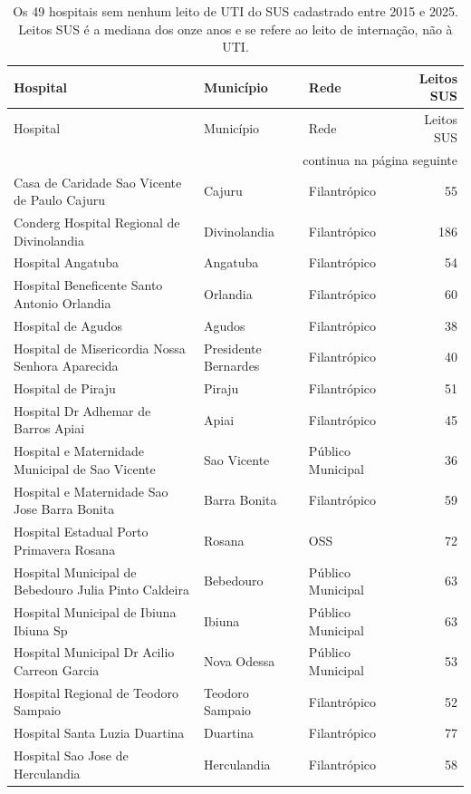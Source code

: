 {\small
\begin{longtable}{p{}p{}lr}
\caption{Os 49 hospitais sem nenhum leito de UTI do SUS cadastrado entre
2015 e 2025. Leitos SUS é a mediana dos onze anos e se refere ao leito de
internação, não à UTI.}
\label{tab:semutisus}\\
\toprule
Hospital & Município & Rede & Leitos SUS \\
\midrule
\endfirsthead
\toprule
Hospital & Município & Rede & Leitos SUS \\
\midrule
\endhead
\midrule
\multicolumn{4}{r}{\footnotesize continua na página seguinte}\\
\endfoot
\bottomrule
\endlastfoot
Casa de Caridade Sao Vicente de Paulo Cajuru & Cajuru & Filantrópico & 55 \\
Conderg Hospital Regional de Divinolandia & Divinolandia & Filantrópico & 186 \\
Hospital Angatuba & Angatuba & Filantrópico & 54 \\
Hospital Beneficente Santo Antonio Orlandia & Orlandia & Filantrópico & 60 \\
Hospital de Agudos & Agudos & Filantrópico & 38 \\
Hospital de Misericordia Nossa Senhora Aparecida & Presidente Bernardes & Filantrópico & 40 \\
Hospital de Piraju & Piraju & Filantrópico & 51 \\
Hospital Dr Adhemar de Barros Apiai & Apiai & Filantrópico & 45 \\
Hospital e Maternidade Municipal de Sao Vicente & Sao Vicente & Público Municipal & 36 \\
Hospital e Maternidade Sao Jose Barra Bonita & Barra Bonita & Filantrópico & 59 \\
Hospital Estadual Porto Primavera Rosana & Rosana & OSS & 72 \\
Hospital Municipal de Bebedouro Julia Pinto Caldeira & Bebedouro & Público Municipal & 63 \\
Hospital Municipal de Ibiuna Ibiuna Sp & Ibiuna & Público Municipal & 63 \\
Hospital Municipal Dr Acilio Carreon Garcia & Nova Odessa & Público Municipal & 53 \\
Hospital Regional de Teodoro Sampaio & Teodoro Sampaio & Filantrópico & 52 \\
Hospital Santa Luzia Duartina & Duartina & Filantrópico & 77 \\
Hospital Sao Jose de Herculandia & Herculandia & Filantrópico & 58 \\

\end{longtable}}
